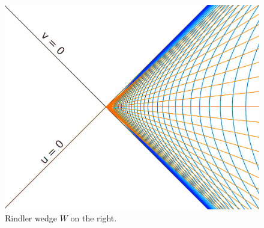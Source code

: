 \documentclass[12pt,a4paper]{article}
\begin{document}
\begin{figure}[h]
\centering
\includegraphics[scale=0.2]{rindler_w.png}
\caption{Rindler wedge $W$ on the right.}
\label{rindlerw}
\end{figure}
\end{document}
